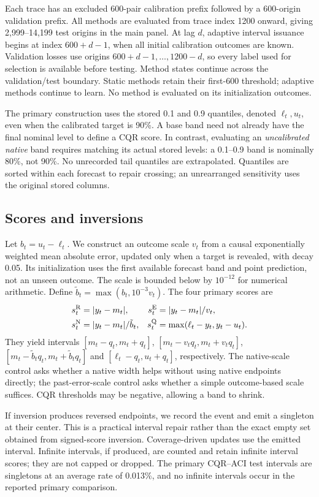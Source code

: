 \documentclass[preprint,11pt]{elsarticle}
\begin{document}
Each trace has an excluded 600-pair calibration prefix followed by a 600-origin validation
prefix. All methods are evaluated from trace index 1200 onward, giving 2,999--14,199 test
origins in the main panel. At lag $d$, adaptive interval issuance begins at index $600+d-1$,
when all initial calibration outcomes are known. Validation losses use origins
$600+d-1,\ldots,1200-d$, so every label used for selection is available before testing.
Method states continue across the validation/test boundary. Static methods retain their
first-600 threshold; adaptive methods continue to learn. No method is evaluated on its
initialization outcomes.

The primary construction uses the stored 0.1 and 0.9 quantiles, denoted $\ell_t,u_t$,
even when the calibrated target is 90\%. A base band need not already have the final
nominal level to define a CQR score. In contrast, evaluating an \emph{uncalibrated native}
band requires matching its actual stored levels: a 0.1--0.9 band is nominally 80\%, not
90\%. No unrecorded tail quantiles are extrapolated. Quantiles are sorted within each
forecast to repair crossing; an unrearranged sensitivity uses the original stored columns.

\subsection{Scores and inversions}
Let $b_t=u_t-\ell_t$. We construct an outcome scale $v_t$ from a causal exponentially
weighted mean absolute error, updated only when a target is revealed, with decay 0.05.
Its initialization uses the first available forecast band and point prediction, not an
unseen outcome. The scale is bounded below by $10^{-12}$ for numerical arithmetic.
Define $\tilde b_t=\max(b_t,10^{-3}v_t)$. The four primary scores are
\begin{align}
 s_t^{\rm R}&=|y_t-m_t|,&
 s_t^{\rm E}&=|y_t-m_t|/v_t,\\
 s_t^{\rm N}&=|y_t-m_t|/\tilde b_t,&
 s_t^{\rm Q}&=\max(\ell_t-y_t,y_t-u_t).
\end{align}
They yield intervals $[m_t-q_t,m_t+q_t]$, $[m_t-v_tq_t,m_t+v_tq_t]$,
$[m_t-\tilde b_tq_t,m_t+\tilde b_tq_t]$ and $[\ell_t-q_t,u_t+q_t]$, respectively.
The native-scale control asks whether a native width helps without using native endpoints
directly; the past-error-scale control asks whether a simple outcome-based scale suffices.
CQR thresholds may be negative, allowing a band to shrink.

If inversion produces reversed endpoints, we record the event and emit a singleton at
their center. This is a practical interval repair rather than the exact empty set obtained
from signed-score inversion. Coverage-driven updates use the emitted interval. Infinite
intervals, if produced, are counted and retain infinite interval scores; they are not
capped or dropped. The primary CQR--ACI test intervals are singletons at an average rate
of 0.013\%, and no infinite intervals occur in the reported primary comparison.
\end{document}
